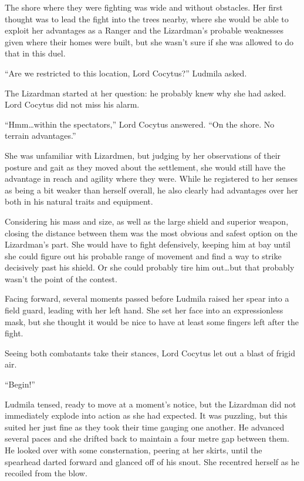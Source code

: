  

The shore where they were fighting was wide and without obstacles. Her first thought was to lead the fight into the trees nearby, where she would be able to exploit her advantages as a Ranger and the Lizardman’s probable weaknesses given where their homes were built, but she wasn’t sure if she was allowed to do that in this duel.

 

“Are we restricted to this location, Lord Cocytus?” Ludmila asked.

 

The Lizardman started at her question: he probably knew why she had asked. Lord Cocytus did not miss his alarm.

 

“Hmm…within the spectators,” Lord Cocytus answered. “On the shore. No terrain advantages.”

 

She was unfamiliar with Lizardmen, but judging by her observations of their posture and gait as they moved about the settlement, she would still have the advantage in reach and agility where they were. While he registered to her senses as being a bit weaker than herself overall, he also clearly had advantages over her both in his natural traits and equipment.

 

Considering his mass and size, as well as the large shield and superior weapon, closing the distance between them was the most obvious and safest option on the Lizardman’s part. She would have to fight defensively, keeping him at bay until she could figure out his probable range of movement and find a way to strike decisively past his shield. Or she could probably tire him out…but that probably wasn’t the point of the contest.

 

Facing forward, several moments passed before Ludmila raised her spear into a field guard, leading with her left hand. She set her face into an expressionless mask, but she thought it would be nice to have at least some fingers left after the fight.

 

Seeing both combatants take their stances, Lord Cocytus let out a blast of frigid air.

 

“Begin!”

 

Ludmila tensed, ready to move at a moment’s notice, but the Lizardman did not immediately explode into action as she had expected. It was puzzling, but this suited her just fine as they took their time gauging one another. He advanced several paces and she drifted back to maintain a four metre gap between them. He looked over with some consternation, peering at her skirts, until the spearhead darted forward and glanced off of his snout. She recentred herself as he recoiled from the blow.

